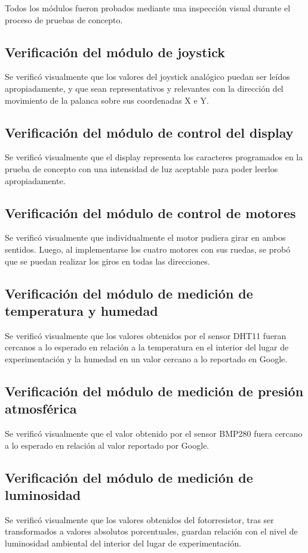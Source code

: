 Todos los módulos fueron probados mediante una inspección visual durante el proceso de pruebas de concepto.


\subsection{Verificación del módulo de joystick}
Se verificó visualmente que los valores del joystick analógico puedan ser leídos apropiadamente, y que sean representativos y relevantes con la dirección del movimiento de la palanca sobre sus coordenadas X e Y.

\subsection{Verificación del módulo de control del display}
Se verificó visualmente que el display representa los caracteres programados en la prueba de concepto con una intensidad de luz aceptable para poder leerlos apropiadamente.


\subsection{Verificación del módulo de control de motores}
Se verificó visualmente que individualmente el motor pudiera girar en ambos sentidos. Luego, al implementarse los cuatro motores con sus ruedas, se probó que se puedan realizar los giros en todas las direcciones.

\subsection{Verificación del módulo de medición de temperatura y humedad}
Se verificó visualmente que los valores obtenidos por el sensor DHT11 fueran cercanos a lo esperado en relación a la temperatura en el interior del lugar de experimentación y la humedad en un valor cercano a lo reportado en Google.

\subsection{Verificación del módulo de medición de presión atmosférica}
Se verificó visualmente que el valor obtenido por el sensor BMP280 fuera cercano a lo esperado en relación al valor reportado por Google.


\subsection{Verificación del módulo de medición de luminosidad}
Se verificó visualmente que los valores obtenidos del fotorresistor, tras ser transformados a valores absolutos porcentuales, guardan relación con el nivel de luminosidad ambiental del interior del lugar de experimentación.


